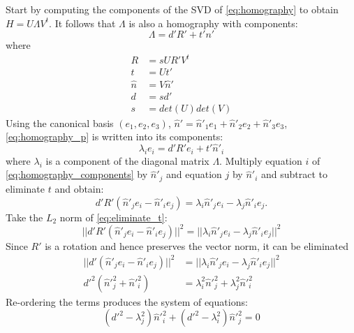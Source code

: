 \documentclass{article}
\begin{document}
Start by computing the components of the SVD of \eqref {eq:homography} to obtain $H = U \Lambda V^t$. It follows that $\Lambda$ is also a homography with components:
%
\begin {equation} \label {eq:homography_p}
\Lambda = d' R' + t' n'
\end {equation}
%
where
%
\begin {equation}
\begin {aligned}
R &= s U R' V^t \\
t &= U t' \\
\hat {n} &= V \hat {n}' \\
d &= s d' \\
s &= det (U) det (V)
\end {aligned}
\end {equation}
%
Using the canonical basis $(e_1, e_2, e_3)$, $\hat {n}' = \hat{n}'_1 e_1 + \hat{n}'_2 e_2 + \hat{n}'_3 e_3$, \eqref {eq:homography_p} is written into its components:
%
\begin {equation} \label {eq:homography_components}
\lambda_i e_i = d' R' e_i + t' \hat{n}'_i
\end {equation}
%
where $\lambda_i$ is a component of the diagonal matrix $\Lambda$.
Multiply equation $i$ of \eqref {eq:homography_components} by $\hat{n}'_j$ and equation $j$ by $\hat{n}'_i$ and subtract to eliminate $t$ and obtain:
%
\begin {equation} \label {eq:eliminate_t}
d' R' (\hat{n}'_j e_i - \hat{n}'_i e_j) = \lambda_i \hat{n}'_j e_i - \lambda_j \hat{n}'_i e_j.
\end {equation}
%
Take the $L_2$ norm of \eqref {eq:eliminate_t}:
%
\begin {equation}
||d' R' (\hat{n}'_j e_i - \hat{n}'_i e_j)||^2 = ||\lambda_i \hat{n}'_j e_i - \lambda_j \hat{n}'_i e_j||^2
\end {equation}
%
Since $R'$ is a rotation and hence preserves the vector norm, it can be eliminated
%
\begin {equation}
\begin {aligned}
||d' (\hat{n}'_j e_i - \hat{n}'_i e_j)||^2 &= ||\lambda_i \hat{n}'_j e_i - \lambda_j \hat{n}'_i e_j||^2 \\
d'^2 (\hat{n}'^2_j + \hat{n}'^2_i) &= \lambda_i^2 \hat{n}'^2_j + \lambda^2_j \hat{n}'^2_i
\end {aligned}
\end {equation}
%
Re-ordering the terms produces the system of equations:
%
\begin {equation}
\label {eq:system_of_equations}
(d'^2 - \lambda_j^2) \hat{n}'^2_i + (d'^2 - \lambda_i^2) \hat{n}'^2_j = 0
\end {equation}
\end{document}
